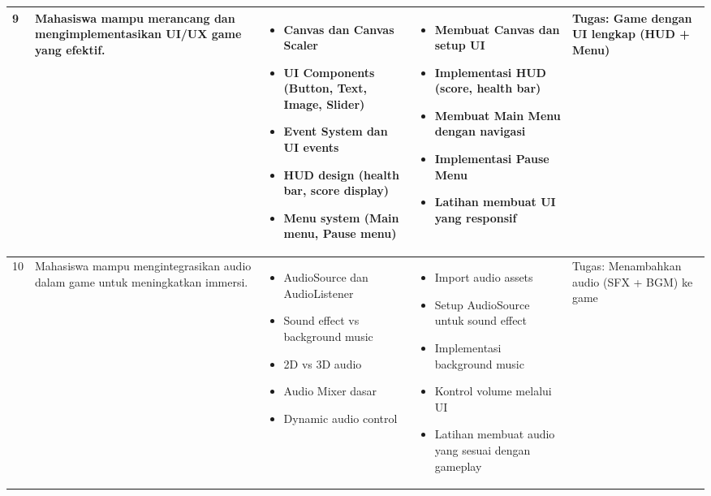 \documentclass[a4paper,12pt]{article}
\begin{document}
\begin{longtable}{|p{0.8cm}|p{3.5cm}|p{4cm}|p{4cm}|p{2.5cm}|}
9 & Mahasiswa mampu merancang dan mengimplementasikan UI/UX game yang efektif. & 
\begin{itemize}[leftmargin=*,nosep]
\item Canvas dan Canvas Scaler
\item UI Components (Button, Text, Image, Slider)
\item Event System dan UI events
\item HUD design (health bar, score display)
\item Menu system (Main menu, Pause menu)
\end{itemize} & 
\begin{itemize}[leftmargin=*,nosep]
\item Membuat Canvas dan setup UI
\item Implementasi HUD (score, health bar)
\item Membuat Main Menu dengan navigasi
\item Implementasi Pause Menu
\item Latihan membuat UI yang responsif
\end{itemize} & 
Tugas: Game dengan UI lengkap (HUD + Menu) \\
\hline

10 & Mahasiswa mampu mengintegrasikan audio dalam game untuk meningkatkan immersi. & 
\begin{itemize}[leftmargin=*,nosep]
\item AudioSource dan AudioListener
\item Sound effect vs background music
\item 2D vs 3D audio
\item Audio Mixer dasar
\item Dynamic audio control
\end{itemize} & 
\begin{itemize}[leftmargin=*,nosep]
\item Import audio assets
\item Setup AudioSource untuk sound effect
\item Implementasi background music
\item Kontrol volume melalui UI
\item Latihan membuat audio yang sesuai dengan gameplay
\end{itemize} & 
Tugas: Menambahkan audio (SFX + BGM) ke game \\
\hline


\end{longtable}
\end{document}
